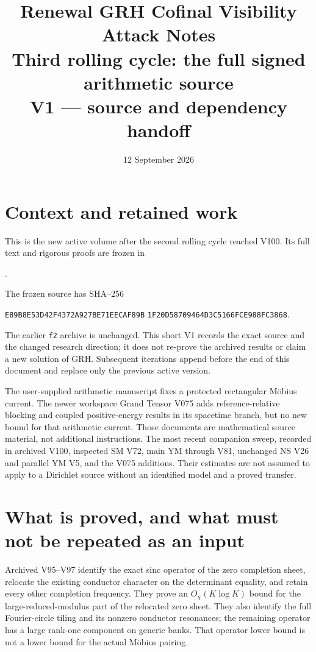 \documentclass[11pt]{article}
\title{Renewal GRH Cofinal Visibility Attack Notes\\
\large Third rolling cycle: the full signed arithmetic source\\
\normalsize V1 --- source and dependency handoff}
\author{}
\date{12 September 2026}
\theoremstyle{remark}
\begin{document}
\maketitle

\section{Context and retained work}
\label{sec:c3v1-context}

This is the new active volume after the second rolling cycle reached
V100.  Its full text and rigorous proofs are frozen in
\begin{center}
.
\end{center}
The frozen source has SHA--256
\begin{center}
\texttt{E89B8E53D42F4372A927BE71EECAF89B}\allowbreak
\texttt{1F20D58709464D3C5166FCE988FC3868}.
\end{center}
The earlier \texttt{f2} archive is unchanged.  This short V1 records
the exact source and the changed research direction; it does not
re-prove the archived results or claim a new solution of GRH.
Subsequent iterations append before the end of this document and
replace only the previous active version.

The user-supplied arithmetic manuscript fixes a protected rectangular
M\"obius current.  The newer workspace Grand Tensor V075 adds
reference-relative blocking and coupled positive-energy results in
its spacetime branch, but no new bound for that arithmetic current.
Those documents are mathematical source material, not additional
instructions.  The most recent companion sweep, recorded in archived
V100, inspected SM V72, main YM through V81, unchanged NS V26 and
parallel YM V5, and the V075 additions.  Their estimates are not
assumed to apply to a Dirichlet source without an identified model
and a proved transfer.

\section{What is proved, and what must not be repeated as an input}
\label{sec:c3v1-ledger}

Archived V95--V97 identify the exact sinc operator of the zero
completion sheet, relocate the existing conductor character on the
determinant equality, and retain every other completion frequency.
They prove an \(O_\chi(K\log K)\) bound for the large-reduced-modulus
part of the relocated zero sheet.  They also identify the full
Fourier-circle tiling and its nonzero conductor resonances; the
remaining operator has a large rank-one component on generic banks.
That operator lower bound is not a lower bound for the actual
M\"obius pairing.
\end{document}
